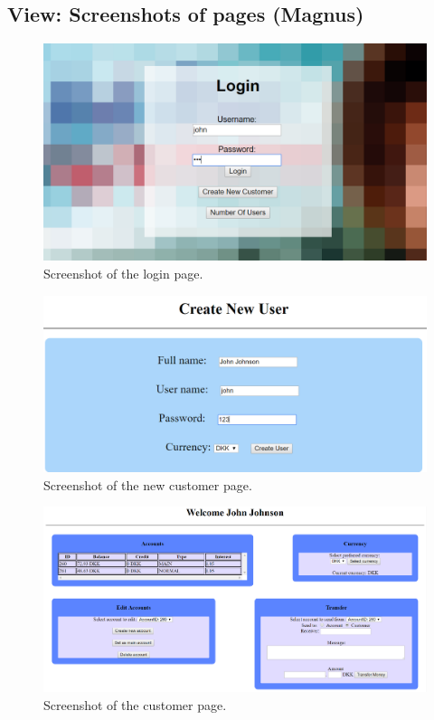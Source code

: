 \subsection{View: Screenshots of pages (Magnus)}\label{sec:appendixView}

\begin{figure}[H]
\centering
\includegraphics[width = 1.0\textwidth]{figures/loginPage.png}
\caption{Screenshot of the login page.}
\label{fig:loginPage1}
\end{figure}

\begin{figure}[H]
\centering
\includegraphics[width = 1.0\textwidth]{figures/newCustomerPage.PNG}
\caption{Screenshot of the new customer page.}
\label{fig:newCustomerPage2}
\end{figure}

\begin{figure}[H]
\centering
\includegraphics[width = 1.0\textwidth]{figures/customerPage1.png}
\caption{Screenshot of the customer page.}
\label{fig:customerPage1}
\end{figure}

